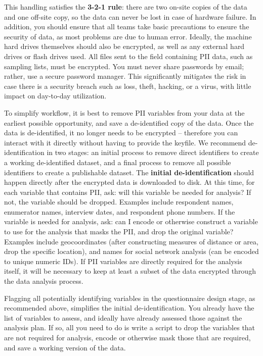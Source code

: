 This handling satisfies the \textbf{3-2-1 rule}: there are
two on-site copies of the data and one off-site copy, so the data can never
be lost in case of hardware failure.
In addition, you should ensure that all teams take basic precautions to ensure the security of data, as most problems are due to human error.
Ideally, the machine hard drives themselves should also be encrypted,
as well as any external hard drives or flash drives used.
All files sent to the field containing PII data, such as sampling lists, must be encrypted.
You must never share passwords by email; rather, use a secure password manager.
This significantly mitigates the risk in case there is a security breach
such as loss, theft, hacking, or a virus, with little impact on day-to-day utilization.

To simplify workflow, it is best to remove PII variables from your data
at the earliest possible opportunity, and save a de-identified copy of the data.
Once the data is de-identified, it no longer needs to be encrypted
-- therefore you can interact with it directly without having to provide the keyfile.
We recommend de-identification in two stages:
an initial process to remove direct identifiers to create a working de-identified dataset,
and a final process to remove all possible identifiers to create a publishable dataset.
The \textbf{initial de-identification} should happen directly after the encrypted data is downloaded to disk.
At this time, for each variable that contains PII, ask: will this variable be needed for analysis?
If not, the variable should be dropped.
Examples include respondent names, enumerator names, interview dates, and respondent phone numbers.
If the variable is needed for analysis, ask:
can I encode or otherwise construct a variable to use for the analysis that masks the PII,
and drop the original variable?
Examples include geocoordinates (after constructing measures of distance or area, drop the specific location), and names for social network analysis (can be encoded to unique numeric IDs).
If PII variables are directly required for the analysis itself,
it will be necessary to keep at least a subset of the data encrypted through the data analysis process.

Flagging all potentially identifying variables in the questionnaire design stage,
as recommended above, simplifies the initial de-identification.
You already have the list of variables to assess,
and ideally have already assessed those against the analysis plan.
If so, all you need to do is write a script to drop the variables that are not required for analysis,
 encode or otherwise mask those that are required, and save a working version of the data.

